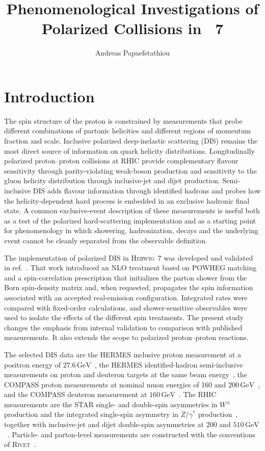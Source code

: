 \documentclass[11pt,a4paper]{article}
\title{Phenomenological Investigations of Polarized Collisions in \Herwig~7}
\author[a]{Andreas Papaefstathiou}
\affiliation[a]{Department of Physics, Kennesaw State University,
830 Polytechnic Lane, Marietta, GA 30060, USA}
\newcommand{\Herwig}{\textsc{Herwig}}
\newcommand{\Rivet}{\textsc{Rivet}}
\newcommand{\GeV}{\ensuremath{\,\mathrm{GeV}}}
\begin{document}
\maketitle
\flushbottom

\section{Introduction}
\label{sec:introduction}

The spin structure of the proton is constrained by measurements that probe
different combinations of partonic helicities and different regions of
momentum fraction and scale.  Inclusive polarized deep-inelastic scattering
(DIS) remains the most direct source of information on quark helicity
distributions.  Longitudinally polarized proton--proton collisions at RHIC
provide complementary flavour sensitivity through parity-violating weak-boson
production and sensitivity to the gluon helicity distribution through
inclusive-jet and dijet production.  Semi-inclusive DIS adds flavour
information through identified hadrons and probes how the helicity-dependent
hard process is embedded in an exclusive hadronic final state.  A common
exclusive-event
description of these measurements is useful both as a test of the polarized
hard-scattering implementation and as a starting point for phenomenology in
which showering, hadronization, decays and the underlying event cannot be
cleanly separated from the observable definition.

The implementation of polarized DIS in \Herwig~7 was developed and validated
in ref.~\cite{Masouminia:2026pol}.  That work introduced an NLO treatment based
on POWHEG matching and a spin-correlation prescription that initializes the
parton shower from the Born spin-density matrix and, when requested, propagates
the spin information associated with an accepted real-emission
configuration.  Integrated rates were compared with fixed-order calculations,
and shower-sensitive observables were used to isolate the effects of the
different spin treatments.  The present study changes the emphasis from
internal validation to comparison with published measurements.  It also
extends the scope to polarized proton--proton reactions.

The selected DIS data are the HERMES inclusive proton measurement at a
positron energy of $27.6\GeV$~\cite{HERMES:2006}, the HERMES identified-hadron
semi-inclusive measurements on proton and deuteron targets at the same beam
energy~\cite{HERMES:2019sidis}, the COMPASS proton measurements at nominal
muon energies of 160 and $200\GeV$~\cite{COMPASS:2010inclusive,COMPASS:2015}, and the
COMPASS deuteron measurement at $160\GeV$~\cite{COMPASS:2016d}.  The RHIC
measurements are the STAR single- and double-spin asymmetries in
$W^\pm$ production and the integrated single-spin asymmetry in
$Z/\gamma^*$ production~\cite{STAR:2018}, together with inclusive-jet and
dijet double-spin asymmetries at 200 and
$510\GeV$~\cite{STAR:2021jets,STAR:2022jets}.  Particle- and parton-level
measurements are constructed with the conventions of
\Rivet~\cite{Bierlich:2019rhm}.
\end{document}
